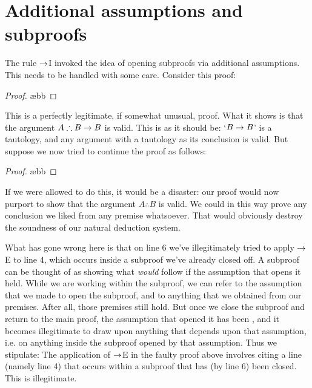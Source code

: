 \section{Additional assumptions and subproofs}
The rule $\rightarrow$I invoked the idea of opening subproofs via additional assumptions. This needs to be handled with some care. Consider this proof:
\begin{proof}
	  
	\open
		 
		 \ae{bb}
	\close
\end{proof}
This is a perfectly legitimate, if somewhat unusual, proof.  What it shows is that the argument $A \therefore B \rightarrow B$ is valid.  This is as it should be: `$B \rightarrow B$' is a tautology, and any argument with a tautology as its conclusion is valid.  But suppose we now tried to continue the proof as follows:
\begin{proof}
	 
	\open
		 
		 \ae{bb}
	\close
\end{proof}
If we were allowed to do this, it would be a disaster: our proof would now purport to show that the argument $A \therefore B$ is valid.   We could in this way prove any conclusion we liked from any premise whatsoever.  That would obviously destroy the soundness of our natural deduction system.

What has gone wrong here is that on line 6 we've illegitimately tried to apply $\rightarrow$E to line 4, which occurs inside a subproof we've already closed off.  A subproof can be thought of as showing what \emph{would} follow if the assumption that opens it held.  While we are working within the subproof, we can refer to the assumption that we made to open the subproof, and to anything that we obtained from our premises. After all, those premises still hold. But once we close the subproof and return to the main proof, the assumption that opened it has been , and it becomes illegitimate to draw upon anything that depends upon that assumption, i.e. on anything inside the subproof opened by that assumption. Thus we stipulate:
The application of $\rightarrow$E in the faulty proof above involves citing a line (namely line 4) that occurs within a subproof that has (by line 6) been closed. This is illegitimate.

